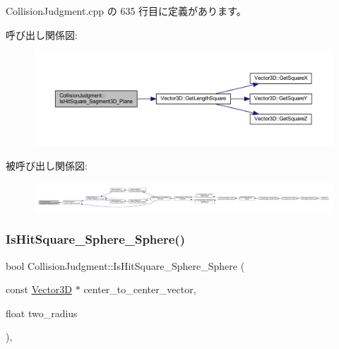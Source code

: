  Collision\+Judgment.\+cpp の 635 行目に定義があります。

呼び出し関係図\+:\nopagebreak
\begin{figure}[H]
\begin{center}
\leavevmode
\includegraphics[width=350pt]{class_collision_judgment_a85481c15b123971458a612a31b1cc57e_cgraph}
\end{center}
\end{figure}
被呼び出し関係図\+:
\nopagebreak
\begin{figure}[H]
\begin{center}
\leavevmode
\includegraphics[width=350pt]{class_collision_judgment_a85481c15b123971458a612a31b1cc57e_icgraph}
\end{center}
\end{figure}
\mbox{\label{class_collision_judgment_ae67e650c3a7b610a6bafaef3f17dadeb}} 
\subsubsection{\texorpdfstring{Is\+Hit\+Square\+\_\+\+Sphere\+\_\+\+Sphere()}{IsHitSquare\_Sphere\_Sphere()}}
{\footnotesize\ttfamily bool Collision\+Judgment\+::\+Is\+Hit\+Square\+\_\+\+Sphere\+\_\+\+Sphere (\begin{DoxyParamCaption}\item[{const \mbox{\hyperlink{class_vector3_d}{Vector3D}} $\ast$}]{center\+\_\+to\+\_\+center\+\_\+vector,  }\item[{float}]{two\+\_\+radius }\end{DoxyParamCaption})\hspace{0.3cm}{\ttfamily [static]}, {\ttfamily [private]}}



